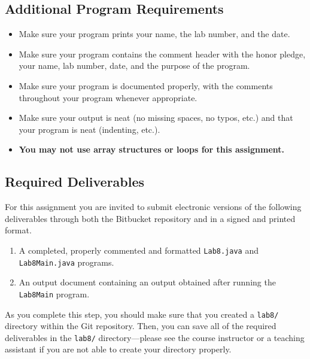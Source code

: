 \vspace{-0.05in}
\subsection*{Additional Program Requirements}
\vspace{-0.05in}
\begin{itemize}
\item Make sure your program prints your name, the lab number, and the date. 
\item Make sure your program contains the comment header with the honor pledge, your name, lab number, date, and the purpose of the program. 
\item Make sure your program is documented properly, with the comments throughout your program whenever appropriate. 
\item Make sure your output
is neat (no missing spaces, no typos, etc.) and that your program is neat (indenting, etc.).
\item \textbf{You may not use array structures or loops for this assignment.}
\end{itemize}

\vspace{-0.2in}
\subsection*{Required Deliverables}
\vspace{-0.05in}

For this assignment you are invited to submit electronic versions of the following deliverables through both the Bitbucket
repository and in a signed and printed format.

\vspace{-0.05in}
\begin{enumerate}
  \item A completed, properly commented and formatted {\tt Lab8.java} and {\tt Lab8Main.java} programs.

  \item An output document containing an output obtained after running the {\tt Lab8Main} program.
        
\end{enumerate}
\vspace{-0.05in}

\noindent As you complete this step, you should make sure that you created a {\tt lab8/} directory within the Git
repository.  Then, you can save all of the required deliverables in the {\tt lab8/} directory---please see the course
instructor or a teaching assistant if you are not able to create your directory properly. 

